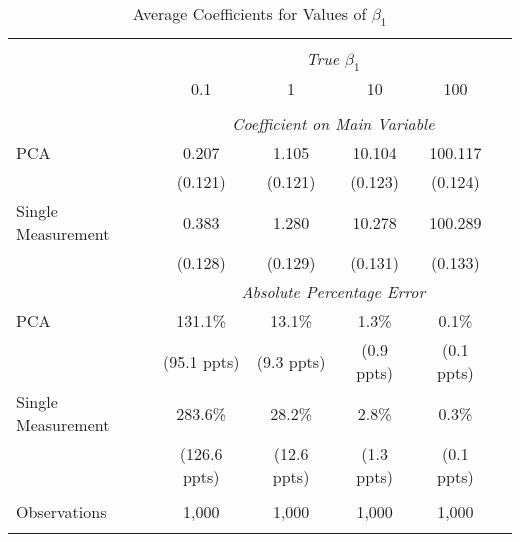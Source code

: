 \begin{table}[!htbp] \centering
  \caption{Average Coefficients for Values of $\beta_1$ \label{sim_beta1_2}}
\begin{tabular}{@{\extracolsep{5pt}}lccccc}
\\[-1.8ex]\hline
\hline \\[-1.8ex]
& \multicolumn{5}{c}{\textit{True $\beta_1$}} \
\cr 
\\[-1.8ex] & 0.1 & 1 & 10 & 100 \\
\hline \\[-1.8ex]
& \multicolumn{5}{c}{\textit{Coefficient on Main Variable}} \\
 PCA & 0.207 & 1.105 & 10.104 & 100.117  \\
  & (0.121) & (0.121) & (0.123) & (0.124)\\
  Single Measurement & 0.383 & 1.280 & 10.278 & 100.289  \\
  & (0.128) & (0.129) & (0.131) & (0.133)\\
& \multicolumn{5}{c}{\textit{Absolute Percentage Error}} \\
  PCA & 131.1\% & 13.1\% & 1.3\% & 0.1\%  \\
   & (95.1 ppts) & (9.3 ppts) & (0.9 ppts) & (0.1 ppts)\\
  Single Measurement & 283.6\% & 28.2\% & 2.8\% & 0.3\%  \\
  & (126.6 ppts) & (12.6 ppts) & (1.3 ppts) & (0.1 ppts)\\
\hline \\[-1.8ex]
 Observations & 1,000 & 1,000 & 1,000 & 1,000 &\\
\hline
\hline \\[-1.8ex]
\end{tabular}
\end{table}
